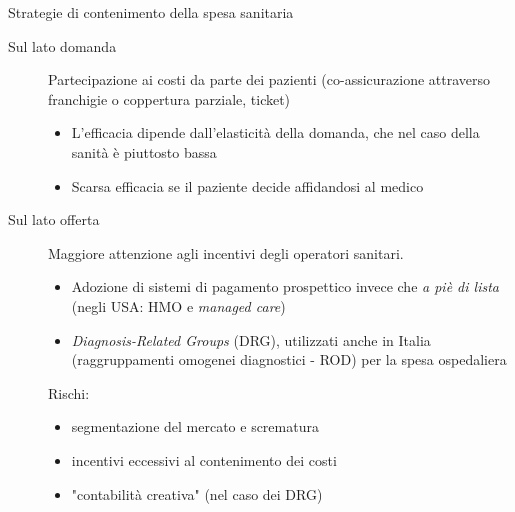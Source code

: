 \documentclass[aspectratio=149,11pt]{beamer}
\begin{document}
\begin{frame}{Strategie di contenimento della spesa sanitaria}
\begin{description}
\item[{Sul lato domanda}] Partecipazione ai costi da parte dei pazienti
(co-assicurazione attraverso franchigie o coppertura parziale, ticket)
\begin{itemize}
\item L'efficacia dipende dall'elasticità della domanda, che nel caso della
sanità è piuttosto bassa
\item Scarsa efficacia se il paziente decide affidandosi al medico
\end{itemize}
\item[{Sul lato offerta}] Maggiore attenzione agli incentivi degli operatori
sanitari.
\begin{itemize}
\item Adozione di sistemi di pagamento prospettico invece che \emph{a piè di lista}
(negli USA: HMO e \emph{managed care})
\item \emph{Diagnosis-Related Groups} (DRG), utilizzati anche in Italia
(raggruppamenti omogenei diagnostici - ROD) per la spesa ospedaliera
\end{itemize}
Rischi: 
\begin{itemize}
\item segmentazione del mercato e scrematura
\item incentivi eccessivi al contenimento dei costi
\item "contabilità creativa" (nel caso dei DRG)
\end{itemize}
\end{description}
\end{frame}
\end{document}
